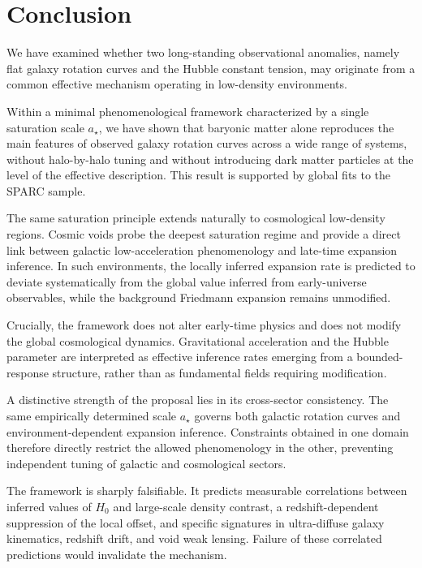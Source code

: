 \section{Conclusion}
  \label{sec:conclusion}

  We have examined whether two long-standing observational anomalies,
  namely flat galaxy rotation curves and the Hubble constant tension,
  may originate from a common effective mechanism operating in low-density environments.

  Within a minimal phenomenological framework characterized by a single
  saturation scale $a_\star$, we have shown that baryonic matter alone
  reproduces the main features of observed galaxy rotation curves across
  a wide range of systems, without halo-by-halo tuning and without
  introducing dark matter particles at the level of the effective description.
  This result is supported by global fits to the SPARC sample.

  The same saturation principle extends naturally to cosmological
  low-density regions.
  Cosmic voids probe the deepest saturation regime and provide a direct
  link between galactic low-acceleration phenomenology and late-time
  expansion inference.
  In such environments, the locally inferred expansion rate is predicted
  to deviate systematically from the global value inferred from
  early-universe observables, while the background Friedmann expansion
  remains unmodified.

  Crucially, the framework does not alter early-time physics and does not
  modify the global cosmological dynamics.
  Gravitational acceleration and the Hubble parameter are interpreted as
  effective inference rates emerging from a bounded-response structure,
  rather than as fundamental fields requiring modification.

  A distinctive strength of the proposal lies in its cross-sector
  consistency.
  The same empirically determined scale $a_\star$ governs both
  galactic rotation curves and environment-dependent expansion inference.
  Constraints obtained in one domain therefore directly restrict the
  allowed phenomenology in the other, preventing independent tuning of
  galactic and cosmological sectors.

  The framework is sharply falsifiable.
  It predicts measurable correlations between inferred values of $H_0$
  and large-scale density contrast, a redshift-dependent suppression of
  the local offset, and specific signatures in ultra-diffuse galaxy
  kinematics, redshift drift, and void weak lensing.
  Failure of these correlated predictions would invalidate the mechanism.

